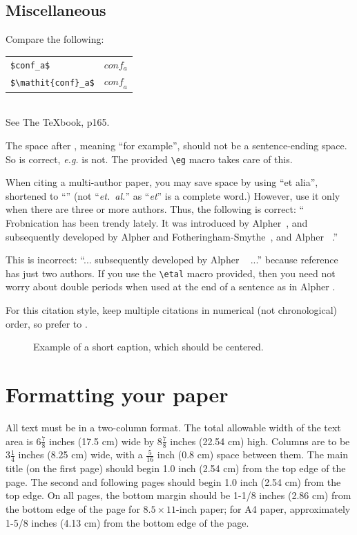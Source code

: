 \documentclass[10pt,twocolumn,letterpaper]{article}
\begin{document}
\subsection{Miscellaneous}

\noindent
Compare the following:\\
\begin{tabular}{ll}
 \verb'$conf_a$' &  $conf_a$ \\
 \verb'$\mathit{conf}_a$' & $\mathit{conf}_a$
\end{tabular}\\
See The \TeX book, p165.

The space after \eg, meaning ``for example'', should not be a
sentence-ending space. So \eg is correct, {\em e.g.} is not.  The provided
\verb'\eg' macro takes care of this.

When citing a multi-author paper, you may save space by using ``et alia'',
shortened to ``\etal'' (not ``{\em et.\ al.}'' as ``{\em et}'' is a complete word.)
However, use it only when there are three or more authors.  Thus, the
following is correct: ``
   Frobnication has been trendy lately.
   It was introduced by Alpher~\cite{Alpher02}, and subsequently developed by
   Alpher and Fotheringham-Smythe~\cite{Alpher03}, and Alpher \etal~\cite{Alpher04}.''

This is incorrect: ``... subsequently developed by Alpher \etal~\cite{Alpher03} ...''
because reference~\cite{Alpher03} has just two authors.  If you use the
\verb'\etal' macro provided, then you need not worry about double periods
when used at the end of a sentence as in Alpher \etal.

For this citation style, keep multiple citations in numerical (not
chronological) order, so prefer \cite{Alpher03,Alpher02,Authors14} to
\cite{Alpher02,Alpher03,Authors14}.

\begin{figure}
\begin{center}
\fbox{\rule{0pt}{2in} \rule{.9\linewidth}{0pt}}
\end{center}
   \caption{Example of a short caption, which should be centered.}
\label{fig:short}
\end{figure}

\section{Formatting your paper}

All text must be in a two-column format. The total allowable width of the
text area is $6\frac78$ inches (17.5 cm) wide by $8\frac78$ inches (22.54
cm) high. Columns are to be $3\frac14$ inches (8.25 cm) wide, with a
$\frac{5}{16}$ inch (0.8 cm) space between them. The main title (on the
first page) should begin 1.0 inch (2.54 cm) from the top edge of the
page. The second and following pages should begin 1.0 inch (2.54 cm) from
the top edge. On all pages, the bottom margin should be 1-1/8 inches (2.86
cm) from the bottom edge of the page for $8.5 \times 11$-inch paper; for A4
paper, approximately 1-5/8 inches (4.13 cm) from the bottom edge of the
page.
\end{document}
